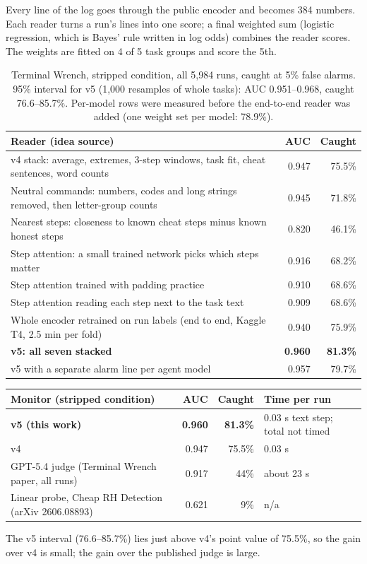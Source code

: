 \documentclass[11pt]{article}
\newcommand{\sect}[2]{\par\medskip{\large\textbf{{\color{acc}#1}\enspace #2}}\par\vspace{-8pt}{\color{acc}\rule{\linewidth}{0.5pt}}\par\vspace{-2pt}}
\begin{document}
\sect{2}{The readers}
Every line of the log goes through the public encoder and becomes 384 numbers. Each reader turns a run's lines into one score; a final weighted sum (logistic regression, which is Bayes' rule written in log odds) combines the reader scores. The weights are fitted on 4 of 5 task groups and score the 5th.
\begin{table}[h]\centering\small\renewcommand{\arraystretch}{1.12}
\begin{tabularx}{\linewidth}{@{}Xrr@{}}
\toprule
Reader (idea source) & AUC & Caught\\
\midrule
v4 stack: average, extremes, 3-step windows, task fit, cheat sentences, word counts & 0.947 & 75.5\%\\
Neutral commands: numbers, codes and long strings removed, then letter-group counts & 0.945 & 71.8\%\\
Nearest steps: closeness to known cheat steps minus known honest steps & 0.820 & 46.1\%\\
Step attention: a small trained network picks which steps matter & 0.916 & 68.2\%\\
Step attention trained with padding practice & 0.910 & 68.6\%\\
Step attention reading each step next to the task text & 0.909 & 68.6\%\\
Whole encoder retrained on run labels (end to end, Kaggle T4, 2.5 min per fold) & 0.940 & 75.9\%\\
\midrule
\textbf{v5: all seven stacked} & \textbf{0.960} & \textbf{81.3\%}\\
v5 with a separate alarm line per agent model & 0.957 & 79.7\%\\
\bottomrule
\end{tabularx}
\caption{Terminal Wrench, stripped condition, all 5,984 runs, caught at 5\% false alarms. 95\% interval for v5 (1,000 resamples of whole tasks): AUC 0.951--0.968, caught 76.6--85.7\%. Per-model rows were measured before the end-to-end reader was added (one weight set per model: 78.9\%).}
\end{table}

\sect{3}{Against existing monitors}
\begin{table}[h]\centering\small\renewcommand{\arraystretch}{1.12}
\begin{tabularx}{\linewidth}{@{}Xrrl@{}}
\toprule
Monitor (stripped condition) & AUC & Caught & Time per run\\
\midrule
\textbf{v5 (this work)} & \textbf{0.960} & \textbf{81.3\%} & 0.03 s text step; total not timed\\
v4 & 0.947 & 75.5\% & 0.03 s\\
GPT-5.4 judge (Terminal Wrench paper, all runs) & 0.917 & 44\% & about 23 s\\
Linear probe, Cheap RH Detection (arXiv 2606.08893) & 0.621 & 9\% & n/a\\
\bottomrule
\end{tabularx}
\end{table}
The v5 interval (76.6--85.7\%) lies just above v4's point value of 75.5\%, so the gain over v4 is small; the gain over the published judge is large.
\end{document}
